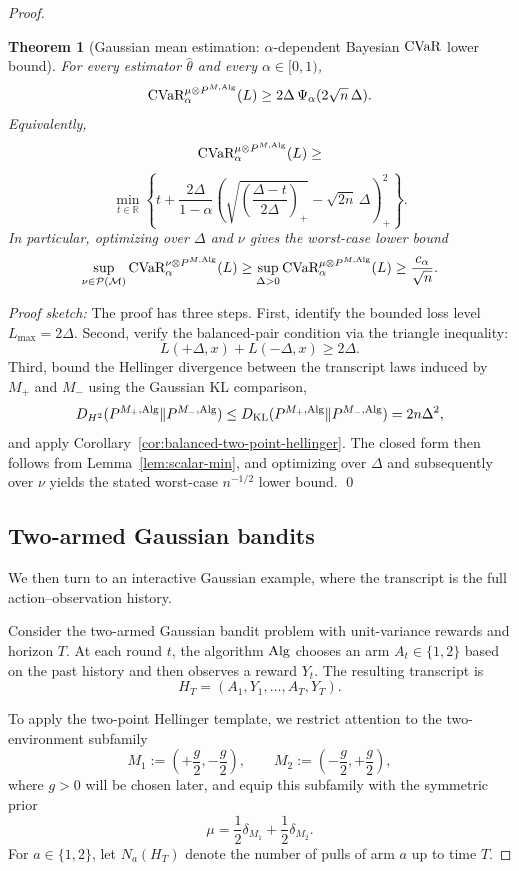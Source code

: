 \documentclass[conference]{IEEEtran}
\newtheorem{theorem}{Theorem}
\begin{document}
\begin{proof}[Proof]
\begin{theorem}[Gaussian mean estimation: \(\alpha\)-dependent Bayesian \(\textup{CVaR}\) lower bound]
\label{prop:gaussian-mean-hellinger-cvar}
For every estimator \(\widehat\theta\) and every \(\alpha\in[0,1)\),
\[
\textup{CVaR}_\alpha^{\mu\otimes P^{M,\textup{Alg}}}(L)
\ge
2\Delta\,\Psi_\alpha(2\sqrt{n}\,\Delta).
\]
Equivalently,
\[
\textup{CVaR}_\alpha^{\mu\otimes P^{M,\textup{Alg}}}(L)
\ge\]
\[
\min_{t\in\mathbb R}
\left\{
t+\frac{2\Delta}{1-\alpha}
\left(
\sqrt{\left(\frac{\Delta-t}{2\Delta}\right)_+}
-\sqrt{2n}\,\Delta
\right)_+^2
\right\}.
\]
In particular, optimizing over \(\Delta\) and \(\nu\) gives the worst-case lower bound
\[
\sup_{\nu \in \mathcal{P}(\mathcal{M})}\textup{CVaR}_\alpha^{\nu\otimes P^{M,\textup{Alg}}}(L)
\ge
\sup_{\Delta>0}\textup{CVaR}_\alpha^{\mu\otimes P^{M,\textup{Alg}}}(L)
\ge
\frac{c_\alpha}{\sqrt n}.
\]
\end{theorem}

\textit{Proof sketch:}
The proof has three steps. First, identify the bounded loss level \(L_{\max}=2\Delta\). Second, verify the balanced-pair condition via the triangle inequality:
\[
L(+\Delta,x)+L(-\Delta,x)\ge 2\Delta.
\]
Third, bound the Hellinger divergence between the transcript laws induced by \(M_+\) and \(M_-\) using the Gaussian KL comparison,
\[
D_{H^2}(P^{M_+,\textup{Alg}}\|P^{M_-,\textup{Alg}})
\le
D_{\textup{KL}}(P^{M_+,\textup{Alg}}\|P^{M_-,\textup{Alg}})
=
2n\Delta^2,
\]
and apply Corollary~\ref{cor:balanced-two-point-hellinger}. The closed form then follows from Lemma~\ref{lem:scalar-min}, and optimizing over \(\Delta\) and subsequently over \(\nu\) yields the stated worst-case \(n^{-1/2}\) lower bound. \qed

\subsection{Two-armed Gaussian bandits}

We then turn to an interactive Gaussian example, where the transcript is the full action--observation history.

Consider the two-armed Gaussian bandit problem with unit-variance rewards and horizon \(T\). At each round \(t\), the algorithm \(\textup{Alg}\) chooses an arm \(A_t\in\{1,2\}\) based on the past history and then observes a reward \(Y_t\). The resulting transcript is
\[
H_T=(A_1,Y_1,\dots,A_T,Y_T).
\]

To apply the two-point Hellinger template, we restrict attention to the two-environment subfamily
\[
M_1:=\left(+\frac{g}{2},-\frac{g}{2}\right),
\qquad
M_2:=\left(-\frac{g}{2},+\frac{g}{2}\right),
\]
where \(g>0\) will be chosen later, and equip this subfamily with the symmetric prior
\[
\mu=\frac12\delta_{M_1}+\frac12\delta_{M_2}.
\]
For \(a\in\{1,2\}\), let \(N_a(H_T)\) denote the number of pulls of arm \(a\) up to time \(T\).


\end{proof}
\end{document}
